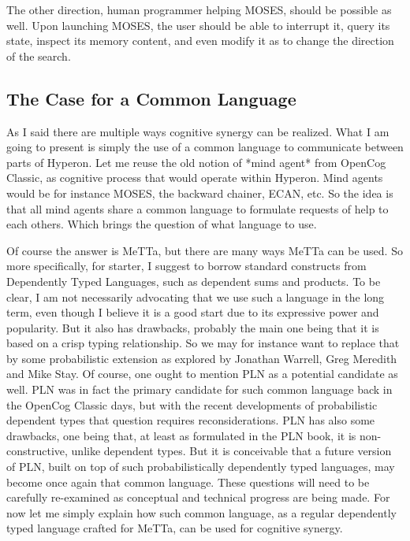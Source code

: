 \documentclass[]{report}
\begin{document}
The other direction, human programmer helping MOSES, should be
possible as well.  Upon launching MOSES, the user should be able to
interrupt it, query its state, inspect its memory content, and even
modify it as to change the direction of the search.

\subsection{The Case for a Common Language}

As I said there are multiple ways cognitive synergy can be realized.
What I am going to present is simply the use of a common language to
communicate between parts of Hyperon.  Let me reuse the old notion of
*mind agent* from OpenCog Classic, as cognitive process that would
operate within Hyperon.  Mind agents would be for instance MOSES, the
backward chainer, ECAN, etc.  So the idea is that all mind agents
share a common language to formulate requests of help to each others.
Which brings the question of what language to use.

Of course the answer is MeTTa, but there are many ways MeTTa can be
used.  So more specifically, for starter, I suggest to borrow standard
constructs from Dependently Typed Languages, such as dependent sums
and products.  To be clear, I am not necessarily advocating that we
use such a language in the long term, even though I believe it is a
good start due to its expressive power and popularity.  But it also
has drawbacks, probably the main one being that it is based on a crisp
typing relationship.  So we may for instance want to replace that by
some probabilistic extension as explored by Jonathan Warrell, Greg
Meredith and Mike Stay.  Of course, one ought to mention PLN as a
potential candidate as well.  PLN was in fact the primary candidate
for such common language back in the OpenCog Classic days, but with
the recent developments of probabilistic dependent types that question
requires reconsiderations.  PLN has also some drawbacks, one being
that, at least as formulated in the PLN book, it is non-constructive,
unlike dependent types.  But it is conceivable that a future version
of PLN, built on top of such probabilistically dependently typed
languages, may become once again that common language.  These
questions will need to be carefully re-examined as conceptual and
technical progress are being made.  For now let me simply explain how
such common language, as a regular dependently typed language crafted
for MeTTa, can be used for cognitive synergy.
\end{document}
